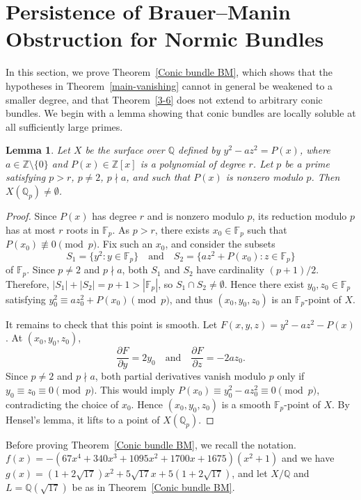 \documentclass[10pt]{amsart}
\theoremstyle{plain}
\newtheorem{lemma}[thm]{Lemma}
\theoremstyle{definition}
\begin{document}
\section{Persistence of Brauer--Manin Obstruction for Normic Bundles}
In this section, we prove Theorem~\ref{Conic bundle BM}, which shows that the hypotheses in Theorem~\ref{main-vanishing} cannot in general be weakened to a smaller degree, and that Theorem~\ref{3-6} does not extend to arbitrary conic bundles. We begin with a lemma showing that conic bundles are locally soluble at all sufficiently large primes.

\begin{lemma}\label{local solubility}
Let \(X\) be the surface over \(\mathbb{Q}\) defined by \(y^2-az^2=P(x)\), where \(a\in\mathbb{Z}\setminus\{0\}\) and \(P(x)\in\mathbb{Z}[x]\) is a polynomial of degree \(r\). Let \(p\) be a prime satisfying \(p>r\), \(p\neq 2\), \(p\nmid a\), and such that \(P(x)\) is nonzero modulo \(p\). Then \(X(\mathbb{Q}_p)\neq\emptyset\).
\end{lemma}

\begin{proof}
Since \(P(x)\) has degree \(r\) and is nonzero modulo \(p\), its reduction modulo \(p\) has at most \(r\) roots in \(\mathbb{F}_p\). As \(p>r\), there exists \(x_0\in\mathbb{F}_p\) such that
\(P(x_0)\not\equiv0\pmod p\). Fix such an \(x_0\), and consider the subsets
\[
S_1=\{y^2:y\in\mathbb{F}_p\}
\quad\text{and}\quad
S_2=\{az^2+P(x_0):z\in\mathbb{F}_p\}
\]
of \(\mathbb{F}_p\). Since \(p\neq2\) and \(p\nmid a\), both \(S_1\) and \(S_2\) have cardinality \((p+1)/2\). Therefore, \(|S_1|+|S_2|=p+1>|\mathbb{F}_p|\),
so \(S_1\cap S_2\neq\emptyset\). Hence there exist \(y_0,z_0\in\mathbb{F}_p\) satisfying \(y_0^2\equiv az_0^2+P(x_0)\pmod p\), and thus \((x_0,y_0,z_0)\) is an \(\mathbb{F}_p\)-point of \(X\).

It remains to check that this point is smooth. Let
\(F(x,y,z)=y^2-az^2-P(x)\). At \((x_0,y_0,z_0)\),
\[
\frac{\partial F}{\partial y}=2y_0
\quad\text{and}\quad
\frac{\partial F}{\partial z}=-2az_0.
\]
Since \(p\neq2\) and \(p\nmid a\), both partial derivatives vanish modulo \(p\) only if \(y_0\equiv z_0\equiv0\pmod p\). This would imply \(P(x_0)\equiv y_0^2-az_0^2\equiv0\pmod p\), contradicting the choice of \(x_0\). Hence \((x_0,y_0,z_0)\) is a smooth \(\mathbb{F}_p\)-point of \(X\). By Hensel's lemma, it lifts to a point of \(X(\mathbb{Q}_p)\).
\end{proof}
Before proving Theorem~\ref{Conic bundle BM}, we recall the notation. $f(x)=-(67x^4+340x^3+1095x^2+1700x+1675)(x^2+1)$ and we have
$g(x)=(1+2\sqrt{17})x^2 +5\sqrt{17}x
+5(1+2\sqrt{17})$,
and let \(X/\mathbb{Q}\) and \(L=\mathbb{Q}(\sqrt{17})\) be as in Theorem~\ref{Conic bundle BM}. 
\end{document}

